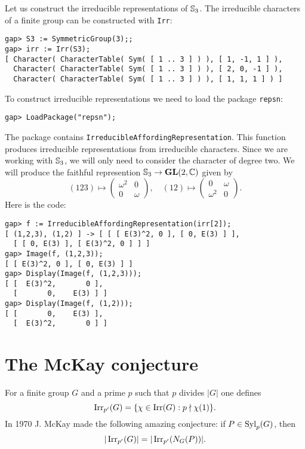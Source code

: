 \begin{example}
Let us construct the irreducible representations of $\mathbb{S}_3$. 
The irreducible characters of a finite group
can be constructed with \lstinline{Irr}:
\begin{lstlisting}
gap> S3 := SymmetricGroup(3);;
gap> irr := Irr(S3);
[ Character( CharacterTable( Sym( [ 1 .. 3 ] ) ), [ 1, -1, 1 ] ), 
  Character( CharacterTable( Sym( [ 1 .. 3 ] ) ), [ 2, 0, -1 ] ), 
  Character( CharacterTable( Sym( [ 1 .. 3 ] ) ), [ 1, 1, 1 ] ) ]
\end{lstlisting}
To construct irreducible representations we need to load the package
\lstinline{repsn}:
\begin{lstlisting}
gap> LoadPackage("repsn");
\end{lstlisting}

The package contains \lstinline{IrreducibleAffordingRepresentation}. This function produces 
irreducible representations from irreducible characters. Since we are working with $\mathbb{S}_3$, we will only need
to consider the character of degree two. We will produce 
the faithful represention $\mathbb{S}_3\to\mathbf{GL}(2,\mathbb{C})$ given by 
\[
	(123)\mapsto\begin{pmatrix}
		\omega^2 & 0\\
		0 & \omega
	\end{pmatrix},
	\quad
	(12)\mapsto\begin{pmatrix}
		0 & \omega \\
		\omega^2 & 0
	\end{pmatrix}.
\]
Here is the code:
\begin{lstlisting}
gap> f := IrreducibleAffordingRepresentation(irr[2]);
[ (1,2,3), (1,2) ] -> [ [ [ E(3)^2, 0 ], [ 0, E(3) ] ], 
  [ [ 0, E(3) ], [ E(3)^2, 0 ] ] ]
gap> Image(f, (1,2,3));
[ [ E(3)^2, 0 ], [ 0, E(3) ] ]
gap> Display(Image(f, (1,2,3)));
[ [  E(3)^2,       0 ],
  [       0,    E(3) ] ]
gap> Display(Image(f, (1,2)));
[ [       0,    E(3) ],
  [  E(3)^2,       0 ] ]
\end{lstlisting}
\end{example}

\section{The McKay conjecture}

For a finite group $G$ and a prime $p$ such that $p$ divides $|G|$ one defines
\[
	\operatorname{Irr}_{p'}(G)=\{\chi\in\operatorname{Irr}(G):p\nmid\chi(1)\}.
\]
In 1970 J. McKay made the following amazing conjecture: if $P\in\mathrm{Syl}_p(G)$,
then 
  \[
	|\operatorname{Irr}_{p'}(G)|=|\operatorname{Irr}_{p'}(N_G(P))|.
  \]


